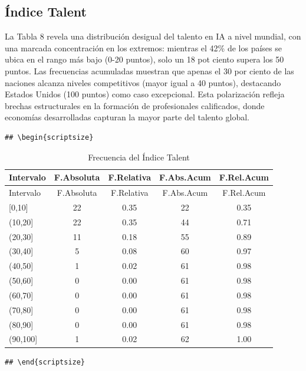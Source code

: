 \documentclass[
]{article}
\begin{document}
\begin{multicols}{2}
\subsection{Índice Talent}

La Tabla 8 revela una distribución desigual del talento en IA a nivel mundial, con una marcada concentración en los extremos: mientras el 42\% de los países se ubica en el rango más bajo (0-20 puntos), solo un 18 pot ciento supera los 50 puntos. Las frecuencias acumuladas muestran que apenas el 30 por ciento de las naciones alcanza niveles competitivos (mayor igual a 40 puntos), destacando Estados Unidos (100 puntos) como caso excepcional. Esta polarización refleja brechas estructurales en la formación de profesionales calificados, donde economías desarrolladas capturan la mayor parte del talento global.

\end{multicols}

\begin{verbatim}
## \begin{scriptsize}
\end{verbatim}

\begin{longtable}[]{@{}lcccc@{}}
\caption{Frecuencia del Índice Talent}\tabularnewline
\toprule\noalign{}
Intervalo & F.Absoluta & F.Relativa & F.Abs.Acum & F.Rel.Acum \\
\midrule\noalign{}
\endfirsthead
\toprule\noalign{}
Intervalo & F.Absoluta & F.Relativa & F.Abs.Acum & F.Rel.Acum \\
\midrule\noalign{}
\endhead
\bottomrule\noalign{}
\endlastfoot
{[}0,10{]} & 22 & 0.35 & 22 & 0.35 \\
(10,20{]} & 22 & 0.35 & 44 & 0.71 \\
(20,30{]} & 11 & 0.18 & 55 & 0.89 \\
(30,40{]} & 5 & 0.08 & 60 & 0.97 \\
(40,50{]} & 1 & 0.02 & 61 & 0.98 \\
(50,60{]} & 0 & 0.00 & 61 & 0.98 \\
(60,70{]} & 0 & 0.00 & 61 & 0.98 \\
(70,80{]} & 0 & 0.00 & 61 & 0.98 \\
(80,90{]} & 0 & 0.00 & 61 & 0.98 \\
(90,100{]} & 1 & 0.02 & 62 & 1.00 \\
\end{longtable}

\begin{verbatim}
## \end{scriptsize}
\end{verbatim}
\end{document}
